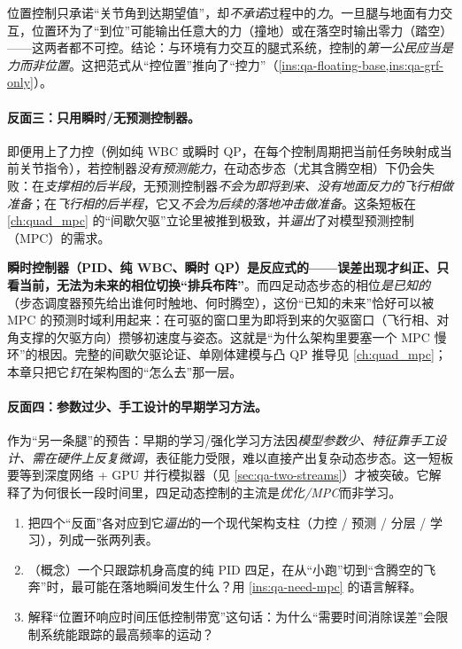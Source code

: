 \begin{pitfall}
位置控制只承诺“关节角到达期望值”，却\emph{不承诺}过程中的\emph{力}。一旦腿与地面有力交互，位置环为了“到位”可能输出任意大的力（撞地）或在落空时输出零力（踏空）——这两者都不可控。结论：与环境有力交互的腿式系统，控制的\emph{第一公民应当是力而非位置}。这把范式从“控位置”推向了“控力”（\cref{ins:qa-floating-base,ins:qa-grf-only}）。
\end{pitfall}

\paragraph{反面三：只用瞬时/无预测控制器。}
即便用上了力控（例如纯 WBC 或瞬时 QP，在每个控制周期把当前任务映射成当前关节指令），若控制器\emph{没有预测能力}，在动态步态（尤其含腾空相）下仍会失败：在\emph{支撑相的后半段}，无预测控制器\emph{不会为即将到来、没有地面反力的飞行相做准备}；在\emph{飞行相的后半程}，它又\emph{不会为后续的落地冲击做准备}\cite{yu2021quadruped}。这条短板在 \cref{ch:quad_mpc} 的“间歇欠驱”立论里被推到极致，并\emph{逼出}了对模型预测控制（MPC）的需求。

\begin{insight}\label{ins:qa-need-mpc}
\textbf{瞬时控制器（PID、纯 WBC、瞬时 QP）是反应式的——误差出现才纠正、只看当前，无法为未来的相位切换“排兵布阵”}。而四足动态步态的相位\emph{是已知的}（步态调度器预先给出谁何时触地、何时腾空），这份“已知的未来”恰好可以被 MPC 的预测时域利用起来：在可驱的窗口里为即将到来的欠驱窗口（飞行相、对角支撑的欠驱方向）攒够初速度与姿态。这就是“为什么架构里要塞一个 MPC 慢环”的根因。完整的间歇欠驱论证、单刚体建模与凸 QP 推导见 \cref{ch:quad_mpc}；本章只把它\emph{钉}在架构图的“怎么去”那一层。
\end{insight}

\paragraph{反面四：参数过少、手工设计的早期学习方法。}
作为“另一条腿”的预告：早期的学习/强化学习方法因\emph{模型参数少、特征靠手工设计、需在硬件上反复微调}，表征能力受限，难以直接产出复杂动态步态\cite{yu2021quadruped}。这一短板要等到深度网络 + GPU 并行模拟器（见 \cref{sec:qa-two-streams}）才被突破。它解释了为何很长一段时间里，四足动态控制的主流是\emph{优化/MPC}而非学习。

\begin{practice}
\begin{enumerate}
  \item 把四个“反面”各对应到它\emph{逼出}的一个现代架构支柱（力控 / 预测 / 分层 / 学习），列成一张两列表。
  \item （概念）一个只跟踪机身高度的纯 PID 四足，在从“小跑”切到“含腾空的飞奔”时，最可能在落地瞬间发生什么？用 \cref{ins:qa-need-mpc} 的语言解释。
  \item 解释“位置环响应时间压低控制带宽”这句话：为什么“需要时间消除误差”会限制系统能跟踪的最高频率的运动？
\end{enumerate}
\end{practice}

